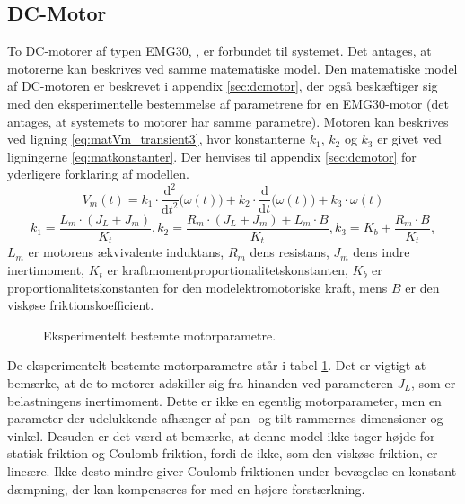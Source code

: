 \subsection{DC-Motor}
To DC-motorer af typen EMG30, \citep{emgmotor}, er forbundet til systemet.
Det antages, at motorerne kan beskrives ved samme matematiske model.
Den matematiske model af DC-motoren er beskrevet i appendix \ref{sec:dcmotor},
der også beskæftiger sig med den eksperimentelle bestemmelse af parametrene for en EMG30-motor
(det antages, at systemets to motorer har samme parametre).
Motoren kan beskrives ved ligning \ref{eq:matVm_transient3}, hvor konstanterne \(k_1\), \(k_2\) og \(k_3\)
er givet ved ligningerne \ref{eq:matkonstanter}. Der henvises til appendix \ref{sec:dcmotor}
for yderligere forklaring af modellen.
\begin{equation}
	V_m\left(t\right)=k_1\cdot{}\frac{\mathrm d^2}{\mathrm d t^2} \big(\omega\left(t\right) \big)
		+k_2\cdot{}\frac{\mathrm d}{\mathrm d t} \big(\omega\left(t\right) \big)
		+k_3\cdot{}\omega\left(t\right)
	\label{eq:matVm_transient3}
 \end{equation}
\begin{equation}
	k_1=\frac{L_m\cdot{}\left(J_L+J_m\right)}{K_t},
	k_2=\frac{R_m\cdot{}\left(J_L+J_m\right)+L_m\cdot{}B}{K_t},
	k_3=K_b+\frac{R_m\cdot{}B}{K_t},
	\label{eq:matkonstanter} 
 \end{equation}
\(L_m\) er motorens ækvivalente induktans, \(R_m\) dens resistans, \(J_m\) dens indre inertimoment,
\(K_t\) er kraftmomentproportionalitetskonstanten, \(K_b\) er proportionalitetskonstanten for den modelektromotoriske kraft,
mens \(B\) er den viskøse friktionskoefficient.
\begin{figure}[th!]
	\centering
	
	\captionsetup{type=table}
	\caption[Motorparametre]
			{Eksperimentelt bestemte motorparametre.}
	\label{tb:matmotorparametre}
\end{figure}
De eksperimentelt bestemte motorparametre står i tabel \ref{tb:matmotorparametre}.
Det er vigtigt at bemærke, at de to motorer adskiller sig fra hinanden ved parameteren \(J_L\), som er belastningens
inertimoment. Dette er ikke en egentlig motorparameter, men en parameter der udelukkende afhænger
af pan- og tilt-rammernes dimensioner og vinkel.
Desuden er det værd at bemærke, at denne model ikke tager højde for statisk friktion og Coulomb-friktion,
fordi de ikke, som den viskøse friktion, er lineære. Ikke desto mindre giver Coulomb-friktionen under
bevægelse en konstant dæmpning, der kan kompenseres for med en højere forstærkning.

